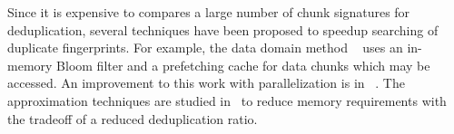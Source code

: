


Since it is expensive to compares a large number of chunk signatures for deduplication,
several techniques have been proposed to speedup searching of duplicate
fingerprints. For example, the data domain method ~\cite{bottleneck08} 
uses  an in-memory Bloom filter and a prefetching cache for data chunks  which may be
accessed.  An improvement to this work with parallelization is in ~\cite{MAD210,DEBAR}.
The approximation techniques are studied in~\cite{extreme_binning09,Guo2011,WeiZhangIEEE}  
to reduce memory requirements with the tradeoff of a reduced deduplication ratio.
